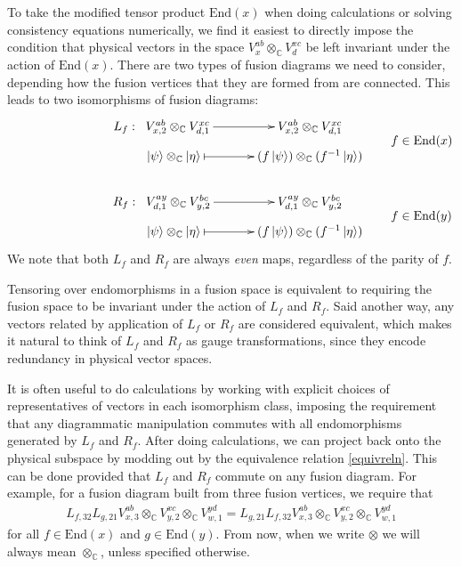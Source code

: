 \documentclass[12pt,a4paper]{article}
\newcommand{\tp}{\otimes}
\newcommand{\cc}{\mathbb{C}}
\newcommand{\End}{\text{End}}
\newcommand{\ket}[1]{\ensuremath{\left|#1\right\rangle}}
\begin{document}
To take the modified tensor product $\End(x)$ when doing calculations or solving consistency equations numerically, we find it easiest to directly impose the condition that physical vectors in the space $V^{ab}_x \tp_{\mathbb{C}} V^{xc}_d$ be left invariant under the action of $\text{End}(x)$. 
There are two types of fusion diagrams we need to consider, depending how the fusion vertices that they are formed from are connected. This leads to two isomorphisms of fusion diagrams:
\begin{align}
&\vcenter{\xymatrix @!0 @M=1mm @C=42mm{
 &L_f: \; \;V^{ab}_{x,2} \tp_{\mathbb{C}} V^{xc}_{d,1} \ar[r]            & V^{ab}_{x,2} \tp_{\mathbb{C}} V^{xc}_{d,1}  \\
		  &\;\;\;\;\;\;\; \ket{\psi}\tp_\mathbb{C} \ket{\eta}  \ar@{|->}[r] & (f\ket{\psi}) \tp_{\mathbb{C}} (f^{-1} \ket{\eta})  
		  }} \quad \quad f \in \text{End}(x)\\
		  \\		  
&		  \vcenter{\xymatrix @!0 @M=1mm @C=42mm{
		  &R_f: \; \;V^{ay}_{d,1} \tp_{\mathbb{C}} V^{bc}_{y,2} \ar[r]            & V^{ay}_{d,1} \tp_{\mathbb{C}} V^{bc}_{y,2} \\
		  &\;\;\;\;\;\;\; \ket{\psi}\tp_\mathbb{C} \ket{\eta}  \ar@{|->}[r] & (f\ket{\psi}) \tp_{\mathbb{C}} (f^{-1} \ket{\eta})
	}}	\quad \quad f \in \text{End}(y)
	\label{DotSlide}
	\end{align}
We note that both $L_f$ and $R_f$ are always {\it even} maps, regardless of the parity of $f$. 

Tensoring over endomorphisms in a fusion space is equivalent to requiring the fusion space to be invariant under the action of $L_f$ and $R_f$. 
Said another way, any vectors related by application of $L_f$ or $R_f$ are considered equivalent, which makes it natural to think of $L_f$ and $R_f$ as gauge transformations, since they encode redundancy in physical vector spaces.

It is often useful to do calculations 
by working with explicit choices of representatives of vectors in each isomorphism class, imposing the requirement that any diagrammatic manipulation commutes with all endomorphisms generated by $L_f$ and $R_f$. 
After doing calculations, we can project back onto the physical subspace by modding out by the equivalence relation \eqref{equivreln}. 
This can be done provided that $L_f$ and $R_f$ commute on any fusion diagram. For example, for a fusion diagram built from three fusion vertices, we require that
\begin{align}
L_{f, 32}L_{g,21} V^{ab}_{x,3} \tp_{\mathbb{C}} V^{xc}_{y,2} \tp_{\mathbb{C}} V^{yd}_{w,1} = L_{g,21} L_{f, 32} V^{ab}_{x,3} \tp_{\mathbb{C}} V^{xc}_{y,2} \tp_{\mathbb{C}} V^{yd}_{w,1} 
\end{align}
for all $f \in \text{End}(x)$ and $g \in \text{End}(y)$. 
From now, when we write $\tp$ we will always mean $\tp_\cc$, unless specified otherwise.
\end{document}
